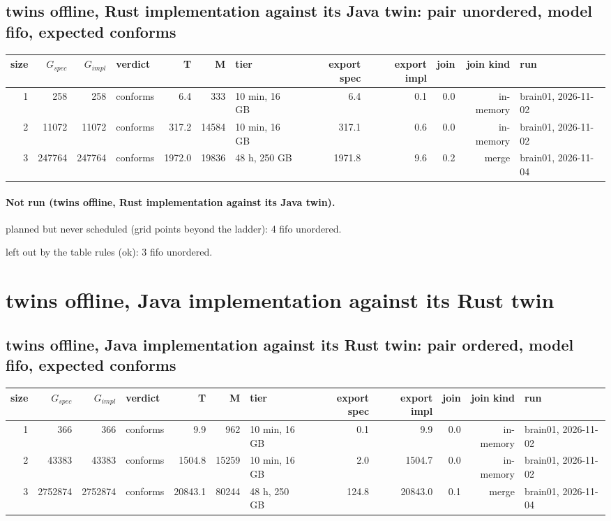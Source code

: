 \documentclass[10pt]{article}
\begin{document}
\subsection*{twins offline, Rust implementation against its Java twin: pair \textsf{unordered}, model fifo, expected conforms}
\begin{longtable}{@{}rrrlrrlrrrrl@{}}
\toprule
size & $G_{\mathit{spec}}$ & $G_{\mathit{impl}}$ & verdict & T & M & tier & export spec & export impl & join & join kind & run \\
\midrule
\endhead
\color{red} 1 & 258 & 258 & conforms & 6.4 & 333 & 10 min, 16 GB & 6.4 & 0.1 & 0.0 & in-memory & brain01, 2026-11-02 \\
\color{red} 2 & 11072 & 11072 & conforms & 317.2 & 14584 & 10 min, 16 GB & 317.1 & 0.6 & 0.0 & in-memory & brain01, 2026-11-02 \\
\color{blue} 3 & 247764 & 247764 & conforms & 1972.0 & 19836 & 48 h, 250 GB & 1971.8 & 9.6 & 0.2 & merge & brain01, 2026-11-04 \\
\bottomrule
\end{longtable}
\paragraph{Not run (twins offline, Rust implementation against its Java twin).}
planned but never scheduled (grid points beyond the ladder): 4 fifo unordered.\par
left out by the table rules (ok): 3 fifo unordered.\par
\section*{twins offline, Java implementation against its Rust twin}
\subsection*{twins offline, Java implementation against its Rust twin: pair \textsf{ordered}, model fifo, expected conforms}
\begin{longtable}{@{}rrrlrrlrrrrl@{}}
\toprule
size & $G_{\mathit{spec}}$ & $G_{\mathit{impl}}$ & verdict & T & M & tier & export spec & export impl & join & join kind & run \\
\midrule
\endhead
\color{red} 1 & 366 & 366 & conforms & 9.9 & 962 & 10 min, 16 GB & 0.1 & 9.9 & 0.0 & in-memory & brain01, 2026-11-02 \\
\color{red} 2 & 43383 & 43383 & conforms & 1504.8 & 15259 & 10 min, 16 GB & 2.0 & 1504.7 & 0.0 & in-memory & brain01, 2026-11-02 \\
\color{blue} 3 & 2752874 & 2752874 & conforms & 20843.1 & 80244 & 48 h, 250 GB & 124.8 & 20843.0 & 0.1 & merge & brain01, 2026-11-04 \\
\bottomrule
\end{longtable}
\end{document}
